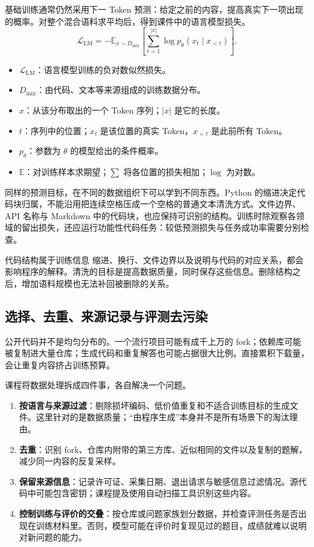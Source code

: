 \documentclass[11pt,a4paper]{article}
\begin{document}
基础训练通常仍然采用下一 Token 预测：给定之前的内容，提高真实下一项出现的概率。对整个混合语料求平均后，得到课件中的语言模型损失。
$$
\mathcal{L}_{\mathrm{LM}}
=-\mathbb{E}_{x\sim D_{\mathrm{mix}}}
\left[\sum_{t=1}^{|x|}\log p_\theta(x_t\mid x_{<t})\right].
$$
\begin{itemize}
\item $\mathcal{L}_{\mathrm{LM}}$：语言模型训练的负对数似然损失。
\item $D_{\mathrm{mix}}$：由代码、文本等来源组成的训练数据分布。
\item $x$：从该分布取出的一个 Token 序列；$|x|$ 是它的长度。
\item $t$：序列中的位置；$x_t$ 是该位置的真实 Token，$x_{<t}$ 是此前所有 Token。
\item $p_\theta$：参数为 $\theta$ 的模型给出的条件概率。
\item $\mathbb{E}$：对训练样本求期望；$\sum$ 将各位置的损失相加；$\log$ 为对数。
\end{itemize}

同样的预测目标，在不同的数据组织下可以学到不同东西。Python 的缩进决定代码块归属，不能沿用把连续空格压成一个空格的普通文本清洗方式。文件边界、API 名称与 Markdown 中的代码块，也应保持可识别的结构。训练时除观察各领域的留出损失，还应运行功能性代码任务：较低预测损失与任务成功率需要分别检查。

\begin{importantbox}{代码结构属于训练信息}
缩进、换行、文件边界以及说明与代码的对应关系，都会影响程序的解释。清洗的目标是提高数据质量，同时保存这些信息。删除结构之后，增加语料规模也无法补回被删除的关系。
\end{importantbox}

\subsection{选择、去重、来源记录与评测去污染}
公开代码并不是均匀分布的。一个流行项目可能有成千上万的 fork；依赖库可能被复制进大量仓库；生成代码和重复解答也可能占据很大比例。直接累积下载量，会让重复内容挤占训练预算。

课程将数据处理拆成四件事，各自解决一个问题。
\begin{enumerate}
\item \textbf{按语言与来源过滤}：剔除损坏编码、低价值重复和不适合训练目标的生成文件。这里针对的是数据质量；“由程序生成”本身并不是所有场景下的淘汰理由。
\item \textbf{去重}：识别 fork、仓库内附带的第三方库、近似相同的文件以及复制的题解，减少同一内容的反复采样。
\item \textbf{保留来源信息}：记录许可证、采集日期、退出请求与敏感信息过滤情况。源代码中可能包含密钥；课程提及使用自动扫描工具识别这些内容。
\item \textbf{控制训练与评价的交叠}：按仓库或问题家族划分数据，并检查评测任务是否出现在训练材料里。否则，模型可能在评价时复现见过的题目，成绩就难以说明对新问题的能力。
\end{enumerate}
\end{document}
